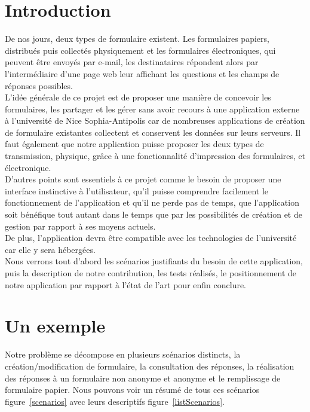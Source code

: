 \documentclass{sigplanconf}
\begin{document}
\section{Introduction}
De nos jours, deux types de formulaire existent. Les formulaires papiers, distribués puis collectés physiquement et les formulaires électroniques, qui peuvent être envoyés par e-mail, les destinataires répondent alors par l’intermédiaire d’une page web leur affichant les questions et les champs de réponses possibles.\\
L’idée générale de ce projet est de proposer une manière de concevoir les formulaires, les partager et les gérer sans avoir recours à une application externe à l’université de Nice Sophia-Antipolis car de nombreuses applications de création de formulaire existantes collectent et conservent les données sur leurs serveurs. Il faut également que notre application puisse proposer les deux types de transmission, physique, grâce à une fonctionnalité d’impression des formulaires, et électronique.\\
D’autres points sont essentiels à ce projet comme le besoin de proposer une interface instinctive à l’utilisateur, qu’il puisse comprendre facilement le fonctionnement de l’application et qu’il ne perde pas de temps, que l’application soit bénéfique tout autant dans le temps que par les possibilités de création et de gestion par rapport à ses moyens actuels. \\
De plus, l’application devra être compatible avec les technologies de l’université car elle y sera hébergées.\\

Nous verrons tout d'abord les scénarios justifiants du besoin de cette application, puis la description de notre contribution, les tests réalisés, le positionnement de notre application par rapport à l'état de l'art pour enfin conclure.


\section{Un exemple}
Notre problème se décompose en plusieurs scénarios distincts, la création/modification de formulaire, la consultation des réponses, la réalisation des réponses à un formulaire non anonyme et anonyme et le remplissage de formulaire papier. Nous pouvons voir un résumé de tous ces scénarios figure~\ref{scenarios} avec leurs descriptifs figure~\ref{listScenarios}.
\end{document}
